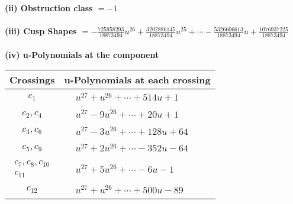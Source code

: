 \documentclass[1p]{elsarticle_modified}
\theoremstyle{definition}
\begin{document}
\flushleft \textbf{(ii) Obstruction class $= -1$}\\~\\
\flushleft \textbf{(iii) Cusp Shapes $= -\frac{725958293}{18873494} u^{26}+\frac{3202886145}{18873494} u^{25}+\cdots-\frac{5326606613}{18873494} u+\frac{1076937225}{18873494}$}\\~\\
\newpage\renewcommand{\arraystretch}{1}
\flushleft \textbf{(iv) u-Polynomials at the component}\newline \\
\begin{tabular}{m{50pt}|m{274pt}}
Crossings & \hspace{64pt}u-Polynomials at each crossing \\
\hline $$\begin{aligned}c_{1}\end{aligned}$$&$\begin{aligned}
&u^{27}+u^{26}+\cdots+514 u+1
\end{aligned}$\\
\hline $$\begin{aligned}c_{2},c_{4}\end{aligned}$$&$\begin{aligned}
&u^{27}-9 u^{26}+\cdots+20 u+1
\end{aligned}$\\
\hline $$\begin{aligned}c_{3},c_{6}\end{aligned}$$&$\begin{aligned}
&u^{27}-3 u^{26}+\cdots+128 u+64
\end{aligned}$\\
\hline $$\begin{aligned}c_{5},c_{9}\end{aligned}$$&$\begin{aligned}
&u^{27}+2 u^{26}+\cdots-352 u-64
\end{aligned}$\\
\hline $$\begin{aligned}c_{7},c_{8},c_{10}\\c_{11}\end{aligned}$$&$\begin{aligned}
&u^{27}+5 u^{26}+\cdots-6 u-1
\end{aligned}$\\
\hline $$\begin{aligned}c_{12}\end{aligned}$$&$\begin{aligned}
&u^{27}+u^{26}+\cdots+500 u-89
\end{aligned}$\\
\hline
\end{tabular}\\~\\
\end{document}
